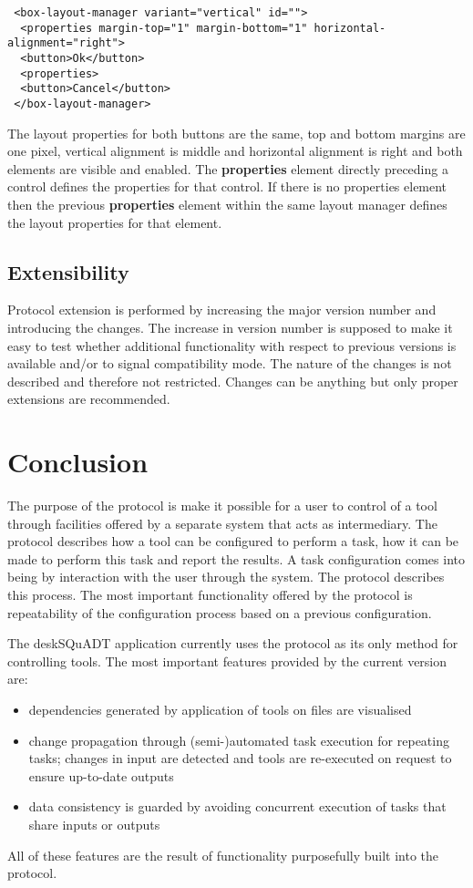 \documentclass{article}
\begin{document}
    \begin{verbatim}
 <box-layout-manager variant="vertical" id="">
  <properties margin-top="1" margin-bottom="1" horizontal-alignment="right">
  <button>Ok</button>
  <properties>
  <button>Cancel</button>
 </box-layout-manager>\end{verbatim}

   \noindent The layout properties for both buttons are the same, top and bottom margins
   are one pixel, vertical alignment is middle and horizontal alignment is right
   and both elements are visible and enabled. The \textbf{properties} element
   directly preceding a control defines the properties for that control. If
   there is no properties element then the previous \textbf{properties} element
   within the same layout manager defines the layout properties for that
   element.

  \subsection{Extensibility}

   Protocol extension is performed by increasing the major version number and
   introducing the changes. The increase in version number is supposed to make
   it easy to test whether additional functionality with respect to previous
   versions is available and/or to signal compatibility mode. The nature of the
   changes is not described and therefore not restricted. Changes can be
   anything but only proper extensions are recommended.
\pagebreak
  \section{Conclusion}

   The purpose of the protocol is make it possible for a user to control of a
   tool through facilities offered by a separate system that acts as
   intermediary. The protocol describes how a tool can be configured to perform
   a task, how it can be made to perform this task and report the results.  A
   task configuration comes into being by interaction with the user through the
   system. The protocol describes this process.  The most important
   functionality offered by the protocol is repeatability of the configuration
   process based on a previous configuration.
   
   The deskSQuADT application currently uses the protocol as its only method
   for controlling tools. The most important features provided by the current
   version are:
    \begin{itemize}
     \item dependencies generated by application of tools on files are
     visualised
     \item change propagation through (semi-)automated task execution for
     repeating tasks; changes in input are detected and tools are re-executed
     on request to ensure up-to-date outputs
     \item data consistency is guarded by avoiding concurrent execution of
     tasks that share inputs or outputs
    \end{itemize}
   All of these features are the result of functionality purposefully built
   into the protocol.
   
\end{document}
